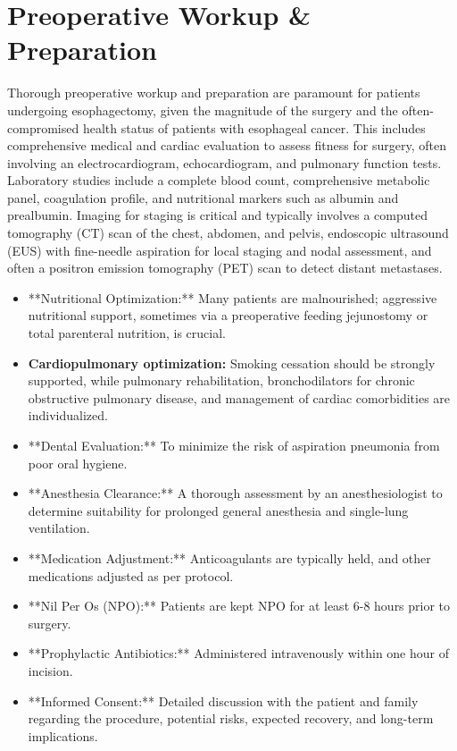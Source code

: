 \section*{Preoperative Workup \& Preparation}
Thorough preoperative workup and preparation are paramount for patients undergoing esophagectomy, given the magnitude of the surgery and the often-compromised health status of patients with esophageal cancer. This includes comprehensive medical and cardiac evaluation to assess fitness for surgery, often involving an electrocardiogram, echocardiogram, and pulmonary function tests. Laboratory studies include a complete blood count, comprehensive metabolic panel, coagulation profile, and nutritional markers such as albumin and prealbumin. Imaging for staging is critical and typically involves a computed tomography (CT) scan of the chest, abdomen, and pelvis, endoscopic ultrasound (EUS) with fine-needle aspiration for local staging and nodal assessment, and often a positron emission tomography (PET) scan to detect distant metastases.

\begin{itemize}
  \item **Nutritional Optimization:** Many patients are malnourished; aggressive nutritional support, sometimes via a preoperative feeding jejunostomy or total parenteral nutrition, is crucial.
  \item \textbf{Cardiopulmonary optimization:} Smoking cessation should be strongly supported, while pulmonary rehabilitation, bronchodilators for chronic obstructive pulmonary disease, and management of cardiac comorbidities are individualized.
  \item **Dental Evaluation:** To minimize the risk of aspiration pneumonia from poor oral hygiene.
  \item **Anesthesia Clearance:** A thorough assessment by an anesthesiologist to determine suitability for prolonged general anesthesia and single-lung ventilation.
  \item **Medication Adjustment:** Anticoagulants are typically held, and other medications adjusted as per protocol.
  \item **Nil Per Os (NPO):** Patients are kept NPO for at least 6-8 hours prior to surgery.
  \item **Prophylactic Antibiotics:** Administered intravenously within one hour of incision.
  \item **Informed Consent:** Detailed discussion with the patient and family regarding the procedure, potential risks, expected recovery, and long-term implications.
\end{itemize}

